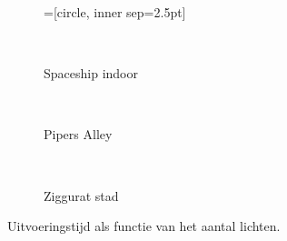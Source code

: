 \begin{figure}[t]
  \hspace{0.05\textwidth}%
  \begin{subfigure}[b]{\textwidth}
  =[circle, inner sep=2.5pt]
    
  \end{subfigure}\hfill\\
  \begin{minipage}[t]{0.5\textwidth}
  \begin{adjustbox}{minipage=\textwidth, scale=0.6}
    \begin{subfigure}[b]{1.6\textwidth}
      \centering
      \def\svgwidth{\textwidth}
      
      \caption{Spaceship indoor}
      \vspace{4pt}
      \label{fig:fds-test-lights:indoor}
    \end{subfigure}
  \end{adjustbox} \\
  \begin{adjustbox}{minipage=\textwidth, scale=0.6}
    \begin{subfigure}[b]{1.6\textwidth}
      \centering
      \def\svgwidth{\textwidth}
      
      \caption{Pipers Alley}
      \vspace{4pt}
      \label{fig:fds-test-lights:alley}
    \end{subfigure}
  \end{adjustbox} \\
  \begin{adjustbox}{minipage=\textwidth, scale=0.6}
    \begin{subfigure}[b]{1.6\textwidth}
      \centering
      \def\svgwidth{\textwidth}
      
      \caption{Ziggurat stad}
      \label{fig:fds-test-lights:city}
    \end{subfigure}
  \end{adjustbox}
  \caption{\small Uitvoeringstijd als functie van het aantal lichten.}

\end{minipage}
\end{figure}
